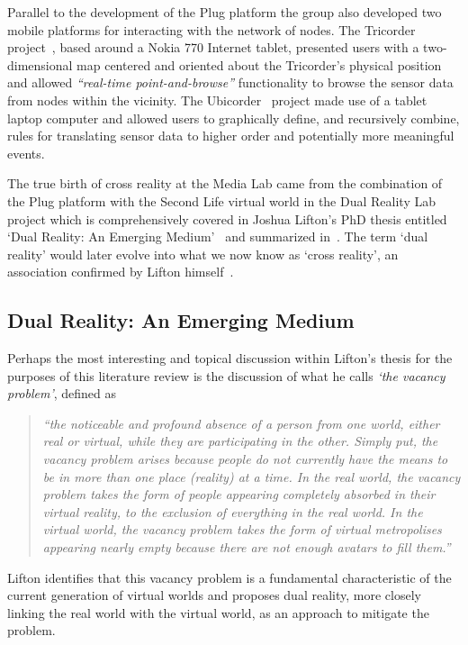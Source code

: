Parallel to the development of the Plug platform the group also developed two mobile platforms for interacting with the network of nodes. The Tricorder project~\cite{Lifton2007}, based around a Nokia 770 Internet tablet, presented users with a two-dimensional map centered and oriented about the Tricorder's physical position and allowed \textit{``real-time point-and-browse''} functionality to browse the sensor data from nodes within the vicinity. The Ubicorder~\cite{Mittal2011} project made use of a tablet laptop computer and allowed users to graphically define, and recursively combine, rules for translating sensor data to higher order and potentially more meaningful events.

The true birth of cross reality at the Media Lab came from the combination of the Plug platform with the Second Life virtual world in the Dual Reality Lab project which is comprehensively covered in Joshua Lifton's PhD thesis entitled `Dual Reality: An Emerging Medium'~\cite{Lifton2007a} and summarized in~\cite{lifton:merging}. The term `dual reality' would later evolve into what we now know as `cross reality', an association confirmed by Lifton himself~\cite{lifton:adoption}.

\subsection{Dual Reality: An Emerging Medium}
\label{subsec:dual_reality_:_an_emerging_medium}
Perhaps the most interesting and topical discussion within Lifton's thesis for the purposes of this literature review is the discussion of what he calls \textit{`the vacancy problem'}, defined as
\begin{quote}
\textit{``the noticeable and profound absence of a person from one world, either real or virtual, while they are participating in the other. Simply put, the vacancy problem arises because people do not currently have the means to be in more than one place (reality) at a time. In the real world, the vacancy problem takes the form of people appearing completely absorbed in their virtual reality, to the exclusion of everything in the real world. In the virtual world, the vacancy problem takes the form of virtual metropolises appearing nearly empty because there are not enough avatars to fill them.''}
\end{quote}
Lifton identifies that this vacancy problem is a fundamental characteristic of the current generation of virtual worlds and proposes dual reality, more closely linking the real world with the virtual world, as an approach to mitigate the problem.

